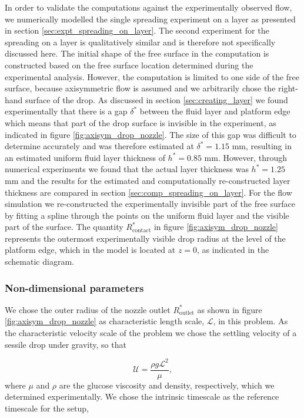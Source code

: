 \documentclass[aip,graphicx]{revtex4-1}
\newcommand{\sym}[1]{\text{#1}} \newcommand{\dif}{\mathrm{d}}
\begin{document}
In order to validate the computations against the experimentally
observed flow, we numerically modelled the single spreading experiment
on a layer as presented in section \ref{sec:expt_spreading_on_layer}.
The second experiment for the spreading on a layer is qualitatively
similar and is therefore not specifically discussed here.  The initial
shape of the free surface in the computation is constructed based on
the free surface location determined during the experimental analysis.
However, the computation is limited to one side of the free surface,
because axisymmetric flow is assumed and we arbitrarily chose the
right-hand surface of the drop.  As discussed in section
\ref{sec:creating_layer} we found experimentally that there is a gap
$\delta^*$ between the fluid layer and platform edge which means that
part of the drop surface is invisible in the experiment, as indicated
in figure \ref{fig:axisym_drop_nozzle}.  The size of this gap was
difficult to determine accurately and was therefore estimated at
$\delta^*=1.15$ mm, resulting in an estimated uniform fluid layer
thickness of $h^*=0.85$ mm.  However, through numerical experiments we
found that the actual layer thickness was $h^*=1.25$ mm and the
results for the estimated and computationally re-constructed layer
thickness are compared in section \ref{sec:comp_spreading_on_layer}.
For the flow simulation we re-constructed the experimentally invisible
part of the free surface by fitting a spline through the points on the
uniform fluid layer and the visible part of the surface.  The quantity
$R_{\sym{contact}}^*$ in figure \ref{fig:axisym_drop_nozzle}
represents the outermost experimentally visible drop radius at the
level of the platform edge, which in the model is located at $z=0$, as
indicated in the schematic diagram.

\subsubsection{Non-dimensional parameters}

We chose the outer radius of the nozzle outlet $R_{\sym{outlet}}^*$ as
shown in figure \ref{fig:axisym_drop_nozzle} as characteristic length
scale, $\mathcal{L}$, in this problem.  As the characteristic velocity
scale of the problem we chose the settling velocity of a sessile drop
under gravity, so that

\begin{equation}
 \mathcal{U}=\frac{\rho g \mathcal{L}^2}{\mu},
 \label{eqn:vel_scale}
\end{equation}
where $\mu$ and $\rho$ are the glucose viscosity and density,
respectively, which we determined experimentally.  We chose the
intrinsic timescale as the reference timescale for the setup,
\end{document}
